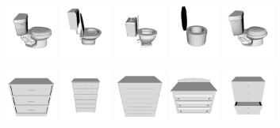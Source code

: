 \begin{figure}[!hbt]
	\includegraphics[width=0.15\textwidth]{Figures/ObjRecog/toilet_0}\hfill
	\includegraphics[width=0.15\textwidth]{Figures/ObjRecog/toilet_1}\hfill
	\includegraphics[width=0.15\textwidth]{Figures/ObjRecog/toilet_2}\hfill
	\includegraphics[width=0.15\textwidth]{Figures/ObjRecog/toilet_3}\hfill
	\includegraphics[width=0.15\textwidth]{Figures/ObjRecog/toilet_4}\hfill

	\includegraphics[width=0.15\textwidth]{Figures/ObjRecog/dresser_0}\hfill
	\includegraphics[width=0.15\textwidth]{Figures/ObjRecog/dresser_1}\hfill
	\includegraphics[width=0.15\textwidth]{Figures/ObjRecog/dresser_2}\hfill
	\includegraphics[width=0.15\textwidth]{Figures/ObjRecog/dresser_3}\hfill
	\includegraphics[width=0.15\textwidth]{Figures/ObjRecog/dresser_4}\hfill
	

\end{figure}
